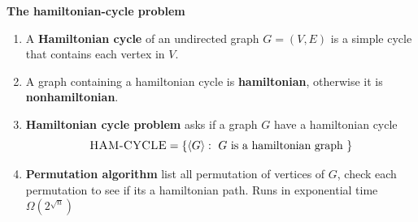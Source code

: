 \documentclass[11pt]{article}
\begin{document}
\begin{defn*}
    \textbf{The hamiltonian-cycle problem}
    \begin{enumerate}
        \item A \textbf{Hamiltonian cycle} of an undirected graph $G = (V,E)$ is a simple cycle that contains each vertex in $V$. \\
        \item A graph containing a hamiltonian cycle is \textbf{hamiltonian}, otherwise it is \textbf{nonhamiltonian}. 
        \item \textbf{Hamiltonian cycle problem} asks if a graph $G$ have a hamiltonian cycle
        \[
            \textsc{HAM-CYCLE} = \{ \langle G \rangle: \text{ $G$ is a hamiltonian graph } \}
        \]
        \item \textbf{Permutation algorithm} list all permutation of vertices of $G$, check each permutation to see if its a hamiltonian path. Runs in exponential time $\Omega(2^{\sqrt{n}})$
    \end{enumerate}
\end{defn*}
\end{document}
